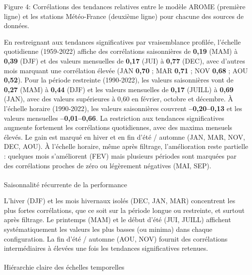 \documentclass[
  article,
  nofooter,
  noheadings]{jss}
\makeatletter
\let\oldparagraph\paragraph
\renewcommand{\paragraph}{
    \@ifstar
      \xxxParagraphStar
      \xxxParagraphNoStar
  }
\newcommand{\xxxParagraphStar}[1]{\oldparagraph*{#1}\mbox{}}
\newcommand{\xxxParagraphNoStar}[1]{\oldparagraph{#1}\mbox{}}
\makeatother
\begin{document}
\begin{center}
Figure 4: Corrélations des tendances relatives entre le modèle AROME (première ligne) et les stations Météo-France (deuxième ligne) pour chacune des sources de données.
\end{center}

En restreignant aux tendances significatives par vraisemblance profilée,
l'échelle quotidienne (1959‑2022) affiche des corrélations saisonnières
de \textbf{0,19} (MAM) à \textbf{0,39} (DJF) et des valeurs mensuelles
de \textbf{0,17} (JUI) à \textbf{0,77} (DEC), avec d'autres mois
marquant une corrélation élevée (JAN \textbf{0,70} ; MAR \textbf{0,71} ;
NOV \textbf{0,68} ; AOU \textbf{0,52}). Pour la période restreinte
(1990‑2022), les valeurs saisonnières vont de \textbf{0,27} (MAM) à
\textbf{0,44} (DJF) et les valeurs mensuelles de \textbf{0,17} (JUILL) à
\textbf{0,69} (JAN), avec des valeurs supérieures à 0,60 en février,
octobre et décembre. À l'échelle horaire (1990‑2022), les valeurs
saisonnières couvrent \textbf{--0,20--0,13} et les valeurs mensuelles
\textbf{--0,01--0,66}. La restriction aux tendances significatives
augmente fortement les corrélations quotidiennes, avec des maxima
mensuels élevés. Le gain est marqué en hiver et en fin d'été / automne
(JAN, MAR, NOV, DEC, AOU). À l'échelle horaire, même après filtrage,
l'amélioration reste partielle : quelques mois s'améliorent (FEV) mais
plusieurs périodes sont marquées par des corrélations proches de zéro ou
légèrement négatives (MAI, SEP).

\paragraph{Saisonnalité récurrente de la
performance}\label{saisonnalituxe9-ruxe9currente-de-la-performance}

L'hiver (DJF) et les mois hivernaux isolés (DEC, JAN, MAR) concentrent
les plus fortes corrélations, que ce soit sur la période longue ou
restreinte, et surtout après filtrage. Le printemps (MAM) et le début
d'été (JUI, JUILL) affichent systématiquement les valeurs les plus
basses (ou minima) dans chaque configuration. La fin d'été / automne
(AOU, NOV) fournit des corrélations intermédiaires à élevées une fois
les tendances significatives retenues.

\paragraph{Hiérarchie claire des échelles
temporelles}\label{hiuxe9rarchie-claire-des-uxe9chelles-temporelles}
\end{document}
